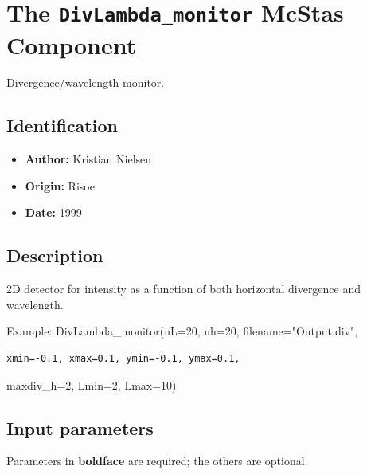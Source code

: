 \section{The \texttt{DivLambda\_monitor} McStas Component}
Divergence/wavelength monitor.

\subsection*{Identification}
\begin{itemize}
  \item \textbf{Author:} Kristian Nielsen
  \item \textbf{Origin:} Risoe
  \item \textbf{Date:} 1999
\end{itemize}

\subsection*{Description}
2D detector for intensity as a function of both horizontal divergence and wavelength.

Example: DivLambda\_monitor(nL=20, nh=20, filename="Output.div",

\begin{verbatim}
xmin=-0.1, xmax=0.1, ymin=-0.1, ymax=0.1,
\end{verbatim}

maxdiv\_h=2, Lmin=2, Lmax=10)

\subsection*{Input parameters}
Parameters in \textbf{boldface} are required; the others are optional.

